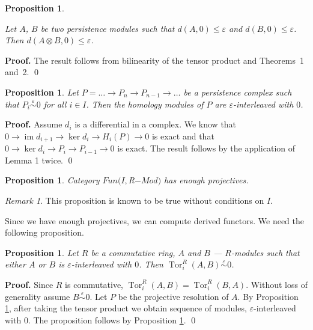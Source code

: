 \documentclass[english,12pt]{article}
\newcounter{stmcounter}[section]
\numberwithin{equation}{section}
\newtheorem{proposition}[stmcounter]{Proposition}
\theoremstyle{definition}
\theoremstyle{remark}
\newtheorem{remark}[stmcounter]{Remark}
\newenvironment{pf}{\noindent\textbf{Proof.}}{\qed}
\renewcommand{\leq}{\leqslant}
\begin{document}
\begin{proposition} ~ \par
  \label{prop:tensor}
  Let $A$, $B$ be two persistence modules such that $d(A,0) \leq \varepsilon$ and $d(B,0) \leq \varepsilon$. Then $d(A \otimes B,0) \leq \varepsilon$.
\end{proposition}

\begin{pf}
  The result follows from bilinearity of the tensor product and Theorems~1 and~2.
\end{pf}

\begin{proposition}
  \label{prop:hominter}
  Let $P = \ldots \to P_n \to P_{n-1} \to \ldots$ be a persistence complex such that $P_i \stackrel{\varepsilon}{\sim} 0$ for all $i \in I$. Then the homology modules of $P$ are $\varepsilon$-interleaved with $0$.
\end{proposition}

\begin{pf}
  Assume $d_i$ is a differential in a complex. We know that $0 \to \operatorname{im}{d_{i+1}} \to \ker{d_{i}} \to H_i(P) \to 0$ is exact and that $0 \to \ker{d_i} \to P_i \to P_{i-1} \to 0$ is exact. The result follows by the application of Lemma 1 twice.
\end{pf}\\

\begin{proposition}
  Category $Fun(I, $R$-Mod)$ has enough projectives.
\end{proposition}

\begin{remark}
 This proposition is known to be true without conditions on $I$. {\cite[Page 2]{Mitchell81}}
\end{remark}

Since we have enough projectives, we can compute derived functors. We need the following proposition.\\

\begin{proposition}
  \label{prop:tor}
  Let $R$ be a commutative ring, $A$ and $B$ --- $R$-modules such that either $A$ or $B$ is $\varepsilon$-interleaved with $0$. Then $\operatorname{Tor}_i^R(A,B) \stackrel{\varepsilon}{\sim} 0$.
\end{proposition}

\begin{pf}
  Since $R$ is commutative, $\operatorname{Tor}_i^R(A,B) = \operatorname{Tor}_i^R(B,A)$. Without loss of generality assume $B \stackrel{\varepsilon}{\sim} 0$. Let $P$ be the projective resolution of $A$. By Proposition \ref{prop:tensor}, after taking the tensor product we obtain sequence of modules, $\varepsilon$-interleaved with $0$. The proposition follows by Proposition \ref{prop:hominter}.
\end{pf}\\
\end{document}
